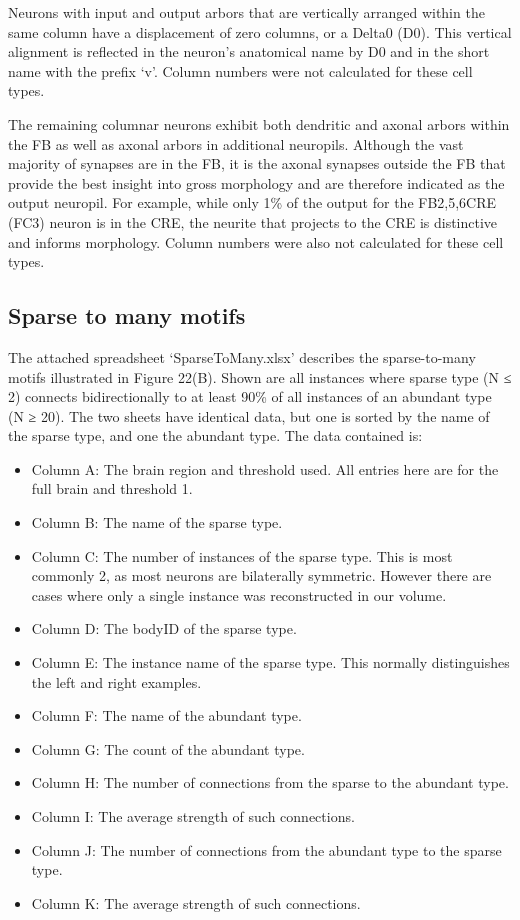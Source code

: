 \documentclass{article}
\begin{document}

Neurons with input and output arbors that are vertically arranged within the same column have a displacement of zero columns, or a Delta0 (D0). This vertical alignment is reflected in the neuron’s anatomical name by D0 and in the short name with the prefix ‘v’. Column numbers were not calculated for these cell types.

The remaining columnar neurons exhibit both dendritic and axonal arbors within the FB as well as axonal arbors in additional neuropils. Although the vast majority of synapses are in the FB, it is the axonal synapses outside the FB that provide the best insight into gross morphology and are therefore indicated as the output neuropil. For example, while only 1\% of the output for the FB2,5,6CRE (FC3) neuron is in the CRE, the neurite that projects to the CRE is distinctive and informs morphology. Column numbers were also not calculated for these cell types.

\subsection*{Sparse to many motifs}

The attached spreadsheet ‘SparseToMany.xlsx’ describes the sparse-to-many motifs illustrated in Figure 22(B). Shown are all instances where sparse type (N ≤ 2) connects bidirectionally to at least 90\% of all instances of an abundant type (N ≥ 20). The two sheets have identical data, but one is sorted by the name of the sparse type, and one the abundant type. The data contained is:

\begin{itemize}
\item Column A: The brain region and threshold used. All entries here are for the full brain and threshold 1.
\item Column B: The name of the sparse type.
\item Column C: The number of instances of the sparse type. This is most commonly 2, as most neurons are bilaterally symmetric. However there are cases where only a single instance was reconstructed in our volume.
\item Column D: The bodyID of the sparse type.
\item Column E: The instance name of the sparse type. This normally distinguishes the left and right examples.
\item Column F: The name of the abundant type.
\item Column G: The count of the abundant type.
\item Column H: The number of connections from the sparse to the abundant type.
\item Column I: The average strength of such connections.
\item Column J: The number of connections from the abundant type to the sparse type.
\item Column K: The average strength of such connections.
\end{itemize}
\end{document}

